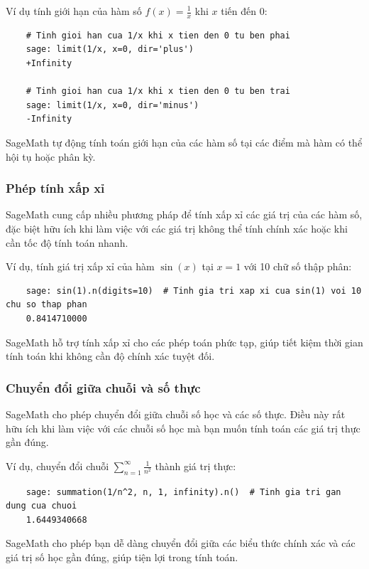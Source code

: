 Ví dụ tính giới hạn của hàm số \(f(x) = \frac{1}{x}\) khi \(x\) tiến đến \(0\):

\begin{lstlisting}
	# Tinh gioi han cua 1/x khi x tien den 0 tu ben phai
	sage: limit(1/x, x=0, dir='plus')
	+Infinity
	
	# Tinh gioi han cua 1/x khi x tien den 0 tu ben trai
	sage: limit(1/x, x=0, dir='minus')
	-Infinity
\end{lstlisting}

SageMath tự động tính toán giới hạn của các hàm số tại các điểm mà hàm có thể hội tụ hoặc phân kỳ.

\subsubsection{Phép tính xấp xỉ}

SageMath cung cấp nhiều phương pháp để tính xấp xỉ các giá trị của các hàm số, đặc biệt hữu ích khi làm việc với các giá trị không thể tính chính xác hoặc khi cần tốc độ tính toán nhanh.

Ví dụ, tính giá trị xấp xỉ của hàm \(\sin(x)\) tại \(x = 1\) với 10 chữ số thập phân:

\begin{lstlisting}
	sage: sin(1).n(digits=10)  # Tinh gia tri xap xi cua sin(1) voi 10 chu so thap phan
	0.8414710000
\end{lstlisting}

SageMath hỗ trợ tính xấp xỉ cho các phép toán phức tạp, giúp tiết kiệm thời gian tính toán khi không cần độ chính xác tuyệt đối.

\subsubsection{Chuyển đổi giữa chuỗi và số thực}

SageMath cho phép chuyển đổi giữa chuỗi số học và các số thực. Điều này rất hữu ích khi làm việc với các chuỗi số học mà bạn muốn tính toán các giá trị thực gần đúng.

Ví dụ, chuyển đổi chuỗi \( \sum_{n=1}^{\infty} \frac{1}{n^2} \) thành giá trị thực:

\begin{lstlisting}
	sage: summation(1/n^2, n, 1, infinity).n()  # Tinh gia tri gan dung cua chuoi
	1.6449340668
\end{lstlisting}

SageMath cho phép bạn dễ dàng chuyển đổi giữa các biểu thức chính xác và các giá trị số học gần đúng, giúp tiện lợi trong tính toán.


